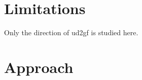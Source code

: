 \documentclass{article}
\begin{document}




\section{Limitations}

Only the direction of ud2gf is studied here. 



\section{Approach}






\end{document}
